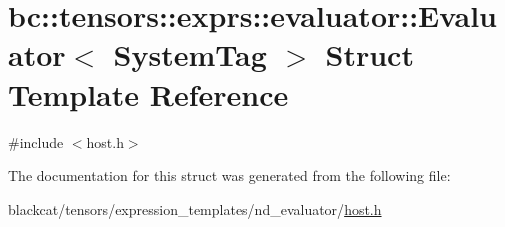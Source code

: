 \hypertarget{structbc_1_1tensors_1_1exprs_1_1evaluator_1_1Evaluator}{}\section{bc\+:\+:tensors\+:\+:exprs\+:\+:evaluator\+:\+:Evaluator$<$ System\+Tag $>$ Struct Template Reference}
\label{structbc_1_1tensors_1_1exprs_1_1evaluator_1_1Evaluator}


{\ttfamily \#include $<$host.\+h$>$}



The documentation for this struct was generated from the following file\+:\begin{DoxyCompactItemize}
\item 
blackcat/tensors/expression\+\_\+templates/nd\+\_\+evaluator/\hyperlink{tensors_2expression__templates_2nd__evaluator_2host_8h}{host.\+h}\end{DoxyCompactItemize}
